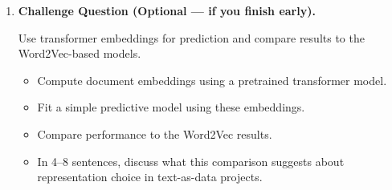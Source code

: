 \documentclass[11pt]{article}
\begin{document}
\begin{enumerate}
\begin{verbatim}
# Predict and evaluate
y_pred = predict(X_test)
compute accuracy
compute confusion_matrix
\end{verbatim}

\noindent In 5--7 sentences, discuss how changing the outcome definition affects interpretation and model performance, even though the text representation and pipeline remain the same.

\item \textbf{Challenge Question (Optional --- if you finish early).}

Use transformer embeddings for prediction and compare results to the Word2Vec-based models.

\begin{itemize}
  \item Compute document embeddings using a pretrained transformer model.
  \item Fit a simple predictive model using these embeddings.
  \item Compare performance to the Word2Vec results.
  \item In 4--8 sentences, discuss what this comparison suggests about representation choice in text-as-data projects.
\end{itemize}

\end{enumerate}
\end{document}
